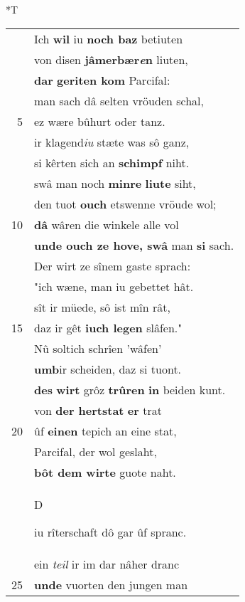 \documentclass[8pt,a4paper,notitlepage]{article}
\begin{document}
\begin{table}[ht]
\begin{minipage}[t]{0.5\linewidth}
\end{minipage}
\hspace{0.5cm}
\begin{minipage}[t]{0.5\linewidth}
\small
\begin{center}*T
\end{center}
\begin{tabular}{rl}
 & Ich \textbf{wil} iu \textbf{noch baz} betiuten\\ 
 & von disen \textbf{jâmerbær\textit{e}n} liuten,\\ 
 & \textbf{dar} \textbf{geriten kom} Parcifal:\\ 
 & man sach dâ selten vröuden schal,\\ 
5 & ez wære bûhurt oder tanz.\\ 
 & ir klagend\textit{iu} stæte was sô ganz,\\ 
 & si kêrten sich an \textbf{schimpf} niht.\\ 
 & swâ man noch \textbf{minre} \textbf{liute} siht,\\ 
 & den tuot \textbf{ouch} etswenne vröude wol;\\ 
10 & \textbf{dâ} wâren die winkele alle vol\\ 
 & \textbf{unde ouch ze hove, swâ} man \textbf{si} sach.\\ 
 & Der wirt ze sînem gaste sprach:\\ 
 & "ich wæne, man iu gebettet hât.\\ 
 & sît ir müede, sô ist mîn rât,\\ 
15 & daz ir gêt \textbf{iuch legen} slâfen."\\ 
 & Nû soltich schrîen 'wâfen'\\ 
 & \textbf{umb}ir scheiden, daz si tuont.\\ 
 & \textbf{des} \textbf{wirt} grôz \textbf{trûren} \textbf{in} beiden kunt.\\ 
 & von \textbf{der hertstat} \textbf{er} trat\\ 
20 & ûf \textbf{einen} tepich an eine stat,\\ 
 & Parcifal, der wol geslaht,\\ 
 & \textbf{bôt dem wirte} guote naht.\\ 
 & \begin{large}D\end{large}iu rîterschaft dô gar ûf spranc.\\ 
 & ein \textit{teil} ir im dar nâher dranc\\ 
25 & \textbf{unde} vuorten den jungen man\\ 

\end{tabular}
\end{minipage}
\end{table}
\end{document}
